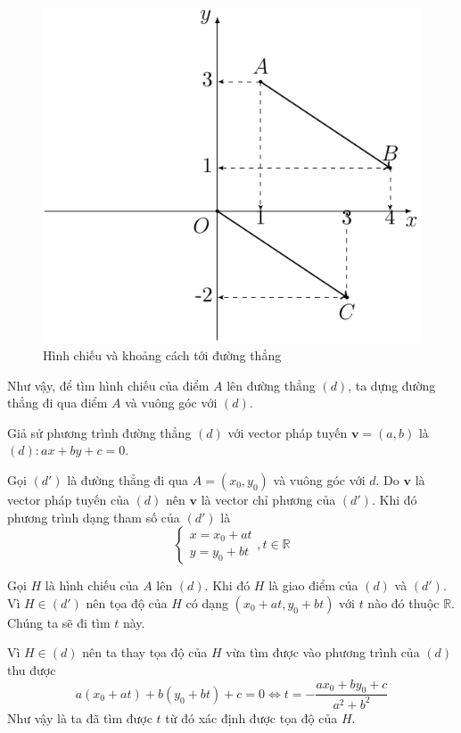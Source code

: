 \begin{figure}[ht]
	\centering
	\includegraphics[page=2]{analytic_geometry/oxy1.pdf}
	\caption{Hình chiếu và khoảng cách tới đường thẳng}
	\label{oxy2}
\end{figure}

Như vậy, để tìm hình chiếu của điểm $A$ lên đường thẳng $(d)$, ta dựng đường thẳng đi qua điểm $A$ và vuông góc với $(d)$.

Giả sử phương trình đường thẳng $(d)$ với vector pháp tuyến $\bm{v} = (a, b)$ là $(d): ax + by + c = 0$.

Gọi $(d')$ là đường thẳng đi qua $A = (x_0, y_0)$ và vuông góc với $d$. Do $\bm{v}$ là vector pháp tuyến của $(d)$ nên $\bm{v}$ là vector chỉ phương của $(d')$. Khi đó phương trình dạng tham số của $(d')$ là \[\begin{cases}
	x = x_0 + a t \\ y = y_0 + b t
\end{cases}, t \in \mathbb{R}\]

Gọi $H$ là hình chiếu của $A$ lên $(d)$. Khi đó $H$ là giao điểm của $(d)$ và $(d')$. Vì $H \in (d')$ nên tọa độ của $H$ có dạng $(x_0 + at, y_0 + bt)$ với $t$ nào đó thuộc $\mathbb{R}$. Chúng ta sẽ đi tìm $t$ này.

Vì $H \in (d)$ nên ta thay tọa độ của $H$ vừa tìm được vào phương trình của $(d)$ thu được \[a (x_0 + at) + b (y_0 + bt) + c = 0 \Leftrightarrow t = -\frac{a x_0 + b y_0 + c}{a^2 + b^2}\]
Như vậy là ta đã tìm được $t$ từ đó xác định được tọa độ của $H$.

